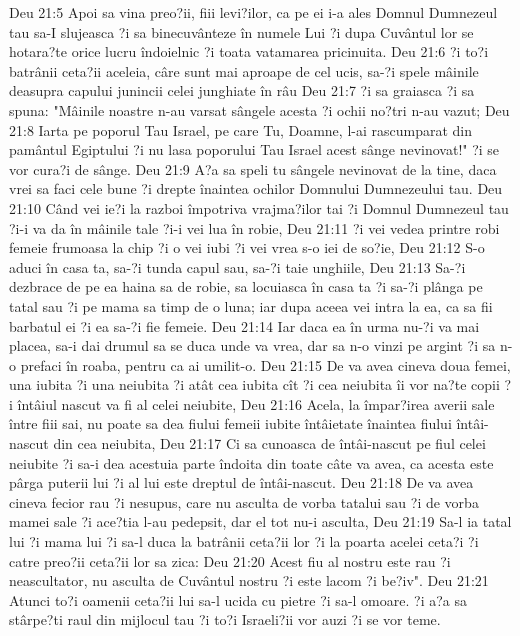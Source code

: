 Deu 21:5  Apoi sa vina preo?ii, fiii levi?ilor, ca pe ei i-a ales Domnul Dumnezeul tau sa-I slujeasca ?i sa binecuvânteze în numele Lui ?i dupa Cuvântul lor se hotara?te orice lucru îndoielnic ?i toata vatamarea pricinuita.
Deu 21:6  ?i to?i batrânii ceta?ii aceleia, câre sunt mai aproape de cel ucis, sa-?i spele mâinile deasupra capului junincii celei junghiate în râu
Deu 21:7  ?i sa graiasca ?i sa spuna: "Mâinile noastre n-au varsat sângele acesta ?i ochii no?tri n-au vazut;
Deu 21:8  Iarta pe poporul Tau Israel, pe care Tu, Doamne, l-ai rascumparat din pamântul Egiptului ?i nu lasa poporului Tau Israel acest sânge nevinovat!" ?i se vor cura?i de sânge.
Deu 21:9  A?a sa speli tu sângele nevinovat de la tine, daca vrei sa faci cele bune ?i drepte înaintea ochilor Domnului Dumnezeului tau.
Deu 21:10  Când vei ie?i la razboi împotriva vrajma?ilor tai ?i Domnul Dumnezeul tau ?i-i va da în mâinile tale ?i-i vei lua în robie,
Deu 21:11  ?i vei vedea printre robi femeie frumoasa la chip ?i o vei iubi ?i vei vrea s-o iei de so?ie,
Deu 21:12  S-o aduci în casa ta, sa-?i tunda capul sau, sa-?i taie unghiile,
Deu 21:13  Sa-?i dezbrace de pe ea haina sa de robie, sa locuiasca în casa ta ?i sa-?i plânga pe tatal sau ?i pe mama sa timp de o luna; iar dupa aceea vei intra la ea, ca sa fii barbatul ei ?i ea sa-?i fie femeie.
Deu 21:14  Iar daca ea în urma nu-?i va mai placea, sa-i dai drumul sa se duca unde va vrea, dar sa n-o vinzi pe argint ?i sa n-o prefaci în roaba, pentru ca ai umilit-o.
Deu 21:15  De va avea cineva doua femei, una iubita ?i una neiubita ?i atât cea iubita cît ?i cea neiubita îi vor na?te copii ?i întâiul nascut va fi al celei neiubite,
Deu 21:16  Acela, la împar?irea averii sale între fiii sai, nu poate sa dea fiului femeii iubite întâietate înaintea fiului întâi-nascut din cea neiubita,
Deu 21:17  Ci sa cunoasca de întâi-nascut pe fiul celei neiubite ?i sa-i dea acestuia parte îndoita din toate câte va avea, ca acesta este pârga puterii lui ?i al lui este dreptul de întâi-nascut.
Deu 21:18  De va avea cineva fecior rau ?i nesupus, care nu asculta de vorba tatalui sau ?i de vorba mamei sale ?i ace?tia l-au pedepsit, dar el tot nu-i asculta,
Deu 21:19  Sa-l ia tatal lui ?i mama lui ?i sa-l duca la batrânii ceta?ii lor ?i la poarta acelei ceta?i ?i catre preo?ii ceta?ii lor sa zica:
Deu 21:20  Acest fiu al nostru este rau ?i neascultator, nu asculta de Cuvântul nostru ?i este lacom ?i be?iv".
Deu 21:21  Atunci to?i oamenii ceta?ii lui sa-l ucida cu pietre ?i sa-l omoare. ?i a?a sa stârpe?ti raul din mijlocul tau ?i to?i Israeli?ii vor auzi ?i se vor teme.

